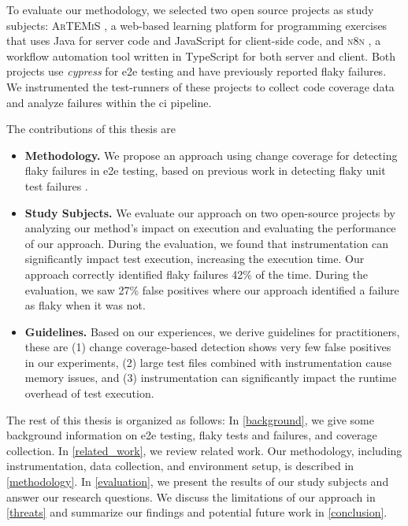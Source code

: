 To evaluate our methodology, we selected two open source projects as study subjects:
\textsc{ArTEMiS} \autocite{krusche_artemis_2018}, a web-based learning platform for programming exercises that uses Java for server code and JavaScript for client-side code, and \textsc{n8n} \autocite{noauthor_n8n_2023}, a workflow automation tool written in TypeScript for both server and client.
Both projects use \textit{cypress} \autocite{noauthor_cypress-iocypress_2023} for \ac{e2e} testing and have previously reported flaky failures.
We instrumented the test-runners of these projects to collect code coverage data and analyze failures within the \ac{ci} pipeline.

The contributions of this thesis are
\begin{itemize}
	\item \textbf{Methodology.} We propose an approach using change coverage for detecting flaky failures in \ac{e2e} testing, based on previous work in detecting flaky unit test failures \autocite{bell_deflaker_2018}.
	\item \textbf{Study Subjects.} We evaluate our approach on two open-source projects by analyzing our method's impact on execution and evaluating the performance of our approach.
	      During the evaluation, we found that instrumentation can significantly impact test execution, increasing the execution time.
	      Our approach correctly identified flaky failures 42\% of the time.
	      During the evaluation, we saw 27\% false positives where our approach identified a failure as flaky when it was not.
	\item \textbf{Guidelines.} Based on our experiences, we derive guidelines for practitioners, these are
	      (1) change coverage-based detection shows very few false positives in our experiments,
	      (2) large test files combined with instrumentation cause memory issues, and
	      (3) instrumentation can significantly impact the runtime overhead of test execution.
\end{itemize}

The rest of this thesis is organized as follows:
In \cref{background}, we give some background information on \ac{e2e} testing, flaky tests and failures, and coverage collection.
In \cref{related_work}, we review related work.
Our methodology, including instrumentation, data collection, and environment setup, is described in \cref{methodology}.
In \cref{evaluation}, we present the results of our study subjects and answer our research questions.
We discuss the limitations of our approach in \cref{threats} and summarize our findings and potential future work in \cref{conclusion}.



